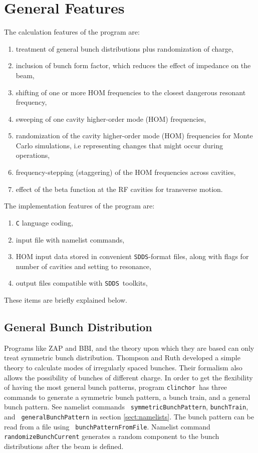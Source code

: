 \documentclass[11pt]{article}
\newcommand{\clinchor}{{\tt clinchor}}
\newcommand{\SDDS}{{\tt SDDS}}
\begin{document}
\section{General Features}
The calculation features of the program are:
\begin{enumerate}
    \item treatment of general bunch distributions plus randomization of charge,
    \item inclusion of bunch form factor, which reduces the effect of
      impedance on the beam,
    \item shifting of one or more HOM frequencies to the closest dangerous resonant frequency,
    \item sweeping of one cavity higher-order mode (HOM) frequencies,
    \item randomization of the cavity higher-order mode (HOM) frequencies for Monte Carlo simulations, i.e representing changes that might occur during operations,
    \item frequency-stepping (staggering) of the HOM frequencies across cavities,
    \item effect of the beta function at the RF cavities for transverse motion.
\end{enumerate}
The implementation features of the program are:
\begin{enumerate}
    \item {\tt C} language coding,
    \item input file with namelist commands,
    \item HOM input data stored in convenient \SDDS-format files, along with flags for number of cavities and setting to resonance,
    \item output files compatible with \SDDS\ toolkits,
\end{enumerate}

These items are briefly explained below.

\subsection{General Bunch Distribution}

Programs like ZAP and BBI, and the theory upon which they are based
can only treat symmetric bunch distribution. Thompson and
Ruth\cite{Thompson:PAC89} developed a simple theory to calculate
modes of irregularly spaced bunches. Their formalism also allows the
possibility of bunches of different charge.  In order to get the
flexibility of having the most general bunch patterns, program
\clinchor\ has three commands to generate a symmetric bunch pattern, a
bunch train, and a general bunch pattern. See namelist commands {\tt
symmetricBunchPattern}, {\tt bunchTrain}, and {\tt
generalBunchPattern} in section \ref{sect:namelists}. The bunch
pattern can be read from a file using {\tt
bunchPatternFromFile}. Namelist command {\tt randomizeBunchCurrent}
generates a random component to the bunch distributions after the beam
is defined.
\end{document}
